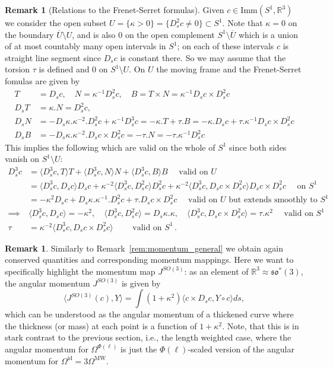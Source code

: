 \documentclass[12pt]{amsart}
\theoremstyle{definition}
\newtheorem{remark}[theorem]{Remark}
\newcommand{\R}{\mathbb R}
\newcommand{\id}{\mathrm{id}}
\newcommand{\Imm}{\mathrm{Imm}}
\newcommand{\OmMW}{\Omega^{\operatorname{MW}}}
\def\ka{\kappa}
\def\ta{\tau}
\def\Om{\Omega}
\def\o{\operatorname{\circ}}
\def\x{\times}
\def\R{{\mathbb R}}
\begin{document}
\begin{remark}[Relations to the Frenet-Serret formulas] Given $c\in \Imm(S^1,\mathbb R^3)$ we consider the open subset 
$U =\{ \ka>0\} = \{D_s^2c\ne 0\}\subset S^1$. Note that $\ka = 0$ on the boundary $\overline U\setminus U$, and is also 0 on the open complement $S^1\setminus \overline U$ which is a union of at most countably many open intervals in $S^1$; on each of these intervals $c$ is straight line segment since $D_sc$ is constant there. So we may assume that the torsion $\ta$ is defined and 0 on $S^1\setminus U$. 
On $U$
the moving frame and the Frenet-Serret fomulas are given by 
\begin{align}
T&= D_sc,\quad N=\ka^{-1}D_s^2c,\quad B = T\x N = \ka^{-1}D_sc\x D_s^2c
\\
D_s T &= \ka.N = D_s^2 c,  
\\
D_s N &=-D_s \ka. \ka^{-2}.D_s^2c + \ka^{-1}D_s^3c =  -\ka.T + \ta.B = -\ka.D_sc + \ta.\ka^{-1}D_sc\x D_s^2c 
\\
D_sB &= -D_s \ka. \ka^{-2}.D_sc\x D_s^2c  =  -\ta.N = -\ta.\ka^{-1}D_s^2c
\end{align}
This implies the following which are valid on the whole of $S^1$ since both sides vanish on $S^1\setminus U$: 
\begin{align}
D_s^3c &= \langle D_s^3c,T\rangle T + \langle D_s^3c,N\rangle N  
+\langle D_s^3c, B\rangle B\quad\text{ valid on }U
\\&
=\langle D_s^3c,D_sc\rangle D_sc + \ka^{-2}\langle D_s^3c,D_s^2c\rangle D_s^2c  
+\ka^{-2}\langle D_s^3c, D_sc\x D_s^2c\rangle D_sc\x D_s^2c\quad\text{ on }S^1
\\&
= -\ka^2 D_sc + D_s \ka. \ka^{-1}.D_s^2c + \ta.D_sc\x D_s^2c \quad\text{ valid on  }U\text{ but extends smoothly to }S^1
\\
\implies &  \langle D_s^3c,D_sc\rangle = -\ka^2, \quad \langle D_s^3c,D_s^2c\rangle = D_s\ka.\ka,
\quad \langle D_s^3c, D_sc\x D_s^2c\rangle = \ta.\ka^2 \quad\text{ valid on }S^1 \label{eq:frenet}
\\
\ta & = \ka^{-2} \langle D_s^3c, D_sc\x D_s^2c\rangle \qquad\text{ valid on }S^1\,.
\end{align}

\end{remark}

\begin{remark}
Similarly to Remark~\ref{rem:momentum_general} we obtain again conserved quantities and corresponding momentum mappings. Here we want to specifically highlight the momentum map   $J^{SO(3)}$: as an element of $\R^3\approx \mathfrak{so}^*(3)$, the angular momentum $J^{SO(3)}$ is given by
\begin{equation}
 \langle J^{SO(3)}(c), Y\rangle = \int (1+\ka^2)\langle c\x D_sc, Y\o c\rangle ds, 
\end{equation}
which can be understood as the angular momentum of a thickened curve where the thickness (or mass) at each point is a function of $1+\ka^2$. Note, that this is in stark contrast to the previous section, i.e., the length weighted case, where the angular momentum for $\Om^{\Phi(\ell)}$ is just the $\Phi(\ell)$-scaled version of the angular momentum for $\Om^{\id}=3\OmMW$. 
\end{remark}
\end{document}
